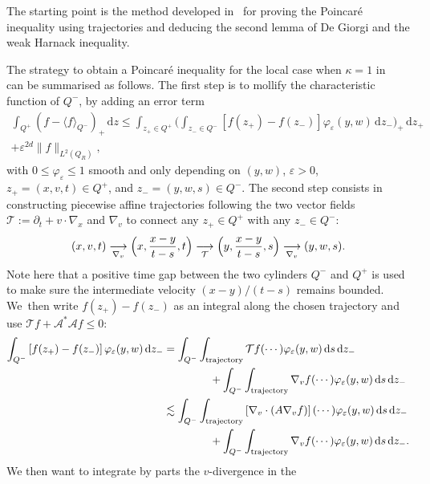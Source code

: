 \documentclass[JEP,XML,SOM,Unicode,NoFloatCountersInSection,published]{cedram}
\theoremstyle{definition}
\newcommand{\cA}{{\mathcal A}}
\newcommand{\cT}{{\mathcal T}}
\newcommand{\dd}{{\, \mathrm d}}
\let\var\varepsilon
\begin{document}
The starting point is the method developed
in~\cite{guerand-mouhot} for proving the Poincaré inequality
using trajectories and deducing the second lemma of De Giorgi and
the weak Harnack inequality.

The strategy to obtain a Poincaré inequality for the local case
when $\kappa =1$ in~\cite{guerand-mouhot} can be summarised as
follows. The first step is to mollify the characteristic function
of $Q^-$, by adding an error term
\begin{multline*}
\int_{Q^+} \left(f-\langle f
\rangle_{Q^{-}}\right)_+ \dd z \le
\int_{z_+ \in Q^+} \biggl(\int_{z_- \in Q^-} \left[ f(z_+)-
f(z_-) \right] \varphi_\var(y,w) \dd z_- \biggr)_+ \dd z_+ \\
+ \var^{2d} \|f\|_{L^2(Q_R)},
\end{multline*}
with $0 \leq \varphi_\var \leq 1$ smooth and only depending on $(y,w)$, $\varepsilon > 0$,
$z_+=(x,v,t) \in Q^+$, and $z_-=(y,w,s) \in Q^-$. The second step
consists in constructing piecewise affine trajectories following
the two vector fields
$\mathcal T := \partial_t + v \cdot \nabla_x$ and $\nabla_v$
to connect any $z_+ \in Q^+$ with any $z_- \in Q^-$:
\begin{align*}
(x,v,t) \underset{\nabla_v}{\longrightarrow}
\Bigl(x,\frac{x-y}{t-s},t\Bigr)
\underset{\cT}{\longrightarrow} \Bigl(y,\frac{x
-y}{t-s},s\Bigr) \underset{\nabla_v}{\longrightarrow}
(y,w,s).
\end{align*}
Note here that a positive time gap between the two cylinders
$Q^-$ and $Q^+$ is used to make sure the intermediate velocity
$(x-y)/(t-s)$ remains bounded. We~then write $f(z_+) - f(z_-)$ as
an integral along the chosen trajectory and use
$\cT f + \cA^* \cA f \le 0$:
\begin{align*}
\int_{Q^-} \left[ f(z_+) - f(z_-)\right]
\varphi_\var(y,w) \dd z_-
& = \int_{Q^-} \int_{\text{trajectory}}
\cT f(\cdots) \varphi_\var(y,w) \dd s \dd z_- \\
& \hspace*{1.5cm} + \int_{Q^-} \int_{\text{trajectory}} \nabla_v f(\cdots)
\varphi_\var(y,w) \dd s \dd z_- \\
& \lesssim \int_{Q^-} \int_{\text{trajectory}}
\left[ \nabla_v \cdot \left(A \nabla_v f \right) \right](\cdots)
\varphi_\var(y,w) \dd s \dd z_- \\
& \hspace*{1.5cm} + \int_{Q^-} \int_{\text{trajectory}} \nabla_v f(\cdots)
\varphi_\var(y,w) \dd s \dd z_-.
\end{align*}
We then want to integrate by parts the $v$-divergence in the
\end{document}
